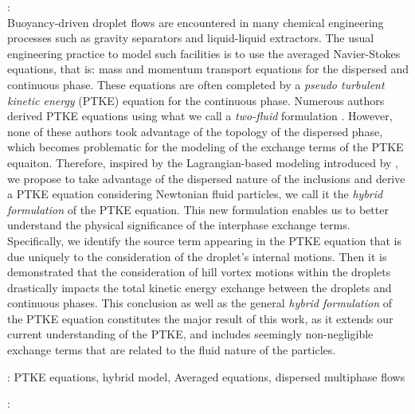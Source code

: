 \documentclass[12pt,a4paper]{article}
\newcommand{\avg}[1]{\left<#1\right>}
\renewcommand{\avg}[1]{\left<#1\right>}
\begin{document}
\vspace{10pt}
:\\
    Buoyancy-driven droplet flows are encountered in many chemical engineering processes such as gravity separators and liquid-liquid extractors. 
    The usual engineering practice to model such facilities is to use the averaged Navier-Stokes equations, that is: mass and momentum transport equations for the dispersed and continuous phase. 
    These equations are often completed by a \textit{pseudo turbulent kinetic energy} (PTKE) equation for the continuous phase. 
    Numerous authors derived PTKE equations using what we call a \textit{two-fluid} formulation \citep{kataoka1986local}. 
    However, none of these authors took advantage of the topology of the dispersed phase, which becomes problematic for the modeling of the exchange terms of the PTKE equaiton. 
    Therefore, inspired by the Lagrangian-based modeling introduced by \citep{buyevich1979flow, lhuillier1992volume}, we propose to take advantage of the dispersed nature of the inclusions and derive a PTKE equation considering Newtonian fluid particles, we call it the \textit{hybrid formulation} of the PTKE equation. 
    This new formulation enables us to better understand the physical significance of the interphase exchange terms. 
    Specifically, we identify the source term appearing in the PTKE equation that is due uniquely to the consideration of the droplet's internal motions.
    Then it is demonstrated that the consideration of hill vortex motions within the droplets drastically impacts the total kinetic energy exchange between the droplets and continuous phases.
    This conclusion as well as the general \textit{hybrid formulation} of the PTKE equation constitutes the major result of this work, as it extends our current understanding of the PTKE, and includes seemingly non-negligible exchange terms that are related to the fluid nature of the particles.
    \vspace{10pt}

: PTKE equations, hybrid model, Averaged equations, dispersed multiphase flows

\vspace{10pt}
:
\end{document}
